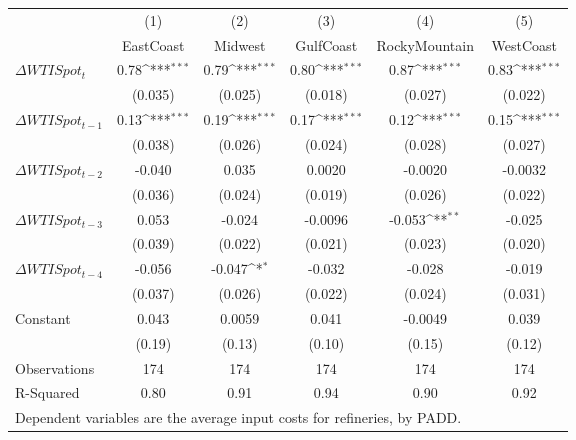 {
\def\sym#1{\ifmmode^{#1}\else\(^{#1}\)\fi}
\begin{tabular}{l*{5}{c}}
\toprule
                    &\multicolumn{1}{c}{(1)}&\multicolumn{1}{c}{(2)}&\multicolumn{1}{c}{(3)}&\multicolumn{1}{c}{(4)}&\multicolumn{1}{c}{(5)}\\
                    &\multicolumn{1}{c}{EastCoast}&\multicolumn{1}{c}{Midwest}&\multicolumn{1}{c}{GulfCoast}&\multicolumn{1}{c}{RockyMountain}&\multicolumn{1}{c}{WestCoast}\\
\midrule
$\Delta WTISpot_t$  &        0.78\sym{***}&        0.79\sym{***}&        0.80\sym{***}&        0.87\sym{***}&        0.83\sym{***}\\
                    &     (0.035)         &     (0.025)         &     (0.018)         &     (0.027)         &     (0.022)         \\
$\Delta WTISpot_{t-1}$&        0.13\sym{***}&        0.19\sym{***}&        0.17\sym{***}&        0.12\sym{***}&        0.15\sym{***}\\
                    &     (0.038)         &     (0.026)         &     (0.024)         &     (0.028)         &     (0.027)         \\
$\Delta WTISpot_{t-2}$&      -0.040         &       0.035         &      0.0020         &     -0.0020         &     -0.0032         \\
                    &     (0.036)         &     (0.024)         &     (0.019)         &     (0.026)         &     (0.022)         \\
$\Delta WTISpot_{t-3}$&       0.053         &      -0.024         &     -0.0096         &      -0.053\sym{**} &      -0.025         \\
                    &     (0.039)         &     (0.022)         &     (0.021)         &     (0.023)         &     (0.020)         \\
$\Delta WTISpot_{t-4}$&      -0.056         &      -0.047\sym{*}  &      -0.032         &      -0.028         &      -0.019         \\
                    &     (0.037)         &     (0.026)         &     (0.022)         &     (0.024)         &     (0.031)         \\
Constant            &       0.043         &      0.0059         &       0.041         &     -0.0049         &       0.039         \\
                    &      (0.19)         &      (0.13)         &      (0.10)         &      (0.15)         &      (0.12)         \\
\midrule
Observations        &         174         &         174         &         174         &         174         &         174         \\
R-Squared           &        0.80         &        0.91         &        0.94         &        0.90         &        0.92         \\
\bottomrule
\multicolumn{6}{l}{\footnotesize Dependent variables are the average input costs for refineries, by PADD.}\\
\end{tabular}
}
